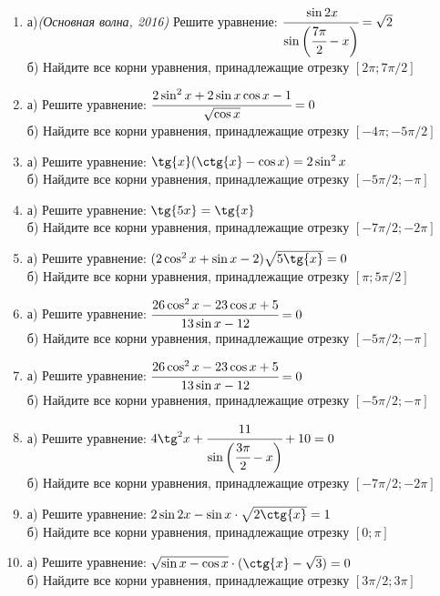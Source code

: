 \documentclass[12pt]{article}
\begin{document}
\begin{enumerate}[start=1,label={\itshape\bfseries \arabic*.}]

\item а)\textit{(Основная волна, 2016)} Решите уравнение: $\cfrac{\sin{2x}}{\sin{\bigg(\cfrac{7\pi}{2} - x\bigg)}} = \sqrt{2}$ \\
      б) Найдите все корни уравнения, принадлежащие отрезку $[2\pi; 7\pi / 2]$

\item а) Решите уравнение: $\cfrac{2\sin^2{x} + 2\sin{x}\cos{x} - 1}{\sqrt{\cos{x}}} = 0$\\
      б) Найдите все корни уравнения, принадлежащие отрезку $[-4\pi; -5\pi / 2]$

\item а) Решите уравнение: $\tg{x} (\ctg{x} - \cos{x}) = 2\sin^2{x}$\\
      б) Найдите все корни уравнения, принадлежащие отрезку $[-5\pi / 2; -\pi]$

\item а) Решите уравнение: $\tg{5x} = \tg{x}$\\
      б) Найдите все корни уравнения, принадлежащие отрезку $[-7\pi / 2; -2\pi]$

\item а) Решите уравнение: $(2\cos^2{x} + \sin{x} - 2) \sqrt{5\tg{x}} = 0$\\
      б) Найдите все корни уравнения, принадлежащие отрезку $[\pi; 5\pi / 2]$

\item а) Решите уравнение: $\cfrac{26\cos^2{x} - 23\cos{x} + 5}{13\sin{x} - 12} = 0$\\
      б) Найдите все корни уравнения, принадлежащие отрезку $[-5\pi / 2; -\pi]$

\item а) Решите уравнение: $\cfrac{26\cos^2{x} - 23\cos{x} + 5}{13\sin{x} - 12} = 0$\\
      б) Найдите все корни уравнения, принадлежащие отрезку $[-5\pi / 2; -\pi]$

\item а) Решите уравнение: $4\tg^2{x} + \cfrac{11}{\sin{\bigg(\cfrac{3\pi}{2} - x\bigg)}} + 10 = 0$\\
      б) Найдите все корни уравнения, принадлежащие отрезку $[-7\pi / 2; -2\pi]$

\item а) Решите уравнение: $2\sin{2x} - \sin{x} \cdot \sqrt{2\ctg{x}} = 1$\\
      б) Найдите все корни уравнения, принадлежащие отрезку $[0; \pi]$

\item а) Решите уравнение: $\sqrt{\sin{x} - \cos{x}} \cdot (\ctg{x} - \sqrt{3}) = 0$\\
      б) Найдите все корни уравнения, принадлежащие отрезку $[3\pi / 2; 3\pi]$
\end{enumerate}
\end{document}
